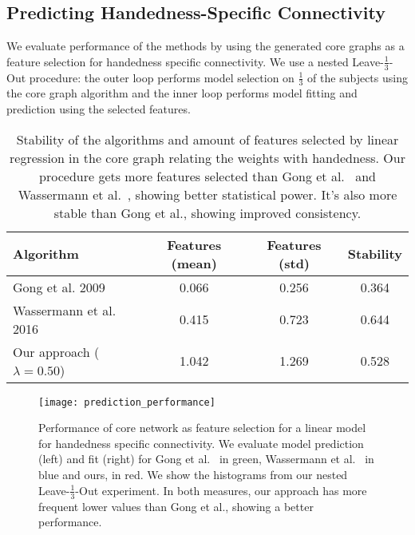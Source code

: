 
\subsection{Predicting Handedness-Specific Connectivity}

We evaluate performance of the methods by using the generated core graphs as a feature selection for handedness specific connectivity. We use a nested Leave-$\tfrac 1 3$-Out procedure: the outer loop performs model selection on $\tfrac 1 3$ of the subjects using the core graph algorithm and the inner loop performs model fitting and prediction using the selected features.

\begin{table}
\centering

\caption{Stability of the algorithms and amount of features selected by linear regression in the core graph relating the weights with handedness. Our procedure gets more features selected than Gong et al.~\cite{Gong2009} and Wassermann et al.~\cite{Wassermann2016}, showing better statistical power. It's also more stable than Gong et al., showing improved consistency. \label{table:number_of_features}}
\begin{tabular}{ l c c c }
	\hline
    Algorithm & Features (mean) & Features (std) & Stability \\
    \hline
    Gong et al. 2009& 0.066 & 0.256 & 0.364 \\
    Wassermann et al. 2016 & 0.415 & 0.723 & 0.644 \\
    Our approach ($\lambda = 0.50$) & 1.042 & 1.269 & 0.528 \\
\end{tabular}
\end{table}


\begin{figure}\center%
  \texttt{[image: prediction\_performance]}
  \caption{Performance of core network as feature selection for a linear model for handedness specific connectivity. We evaluate model prediction (left) and fit (right) for Gong et al.~\cite{Gong2009} in green, Wassermann et al.~\cite{Wassermann2016} in blue and ours, in red. We show the histograms from our nested Leave-$\tfrac 1 3$-Out experiment. In both measures, our approach has more frequent lower values than Gong et al., showing a better performance.\label{fig:prediction_performance}}
\end{figure}

